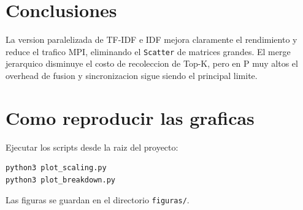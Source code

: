 \documentclass[11pt]{article}
\begin{document}
\section{Conclusiones}
La version paralelizada de TF-IDF e IDF mejora claramente el rendimiento y
reduce el trafico MPI, eliminando el \texttt{Scatter} de matrices grandes.
El merge jerarquico disminuye el costo de recoleccion de Top-K, pero en P muy
altos el overhead de fusion y sincronizacion sigue siendo el principal limite.

\section{Como reproducir las graficas}
Ejecutar los scripts desde la raiz del proyecto:
\begin{verbatim}
python3 plot_scaling.py
python3 plot_breakdown.py
\end{verbatim}
Las figuras se guardan en el directorio \texttt{figuras/}.
\end{document}
